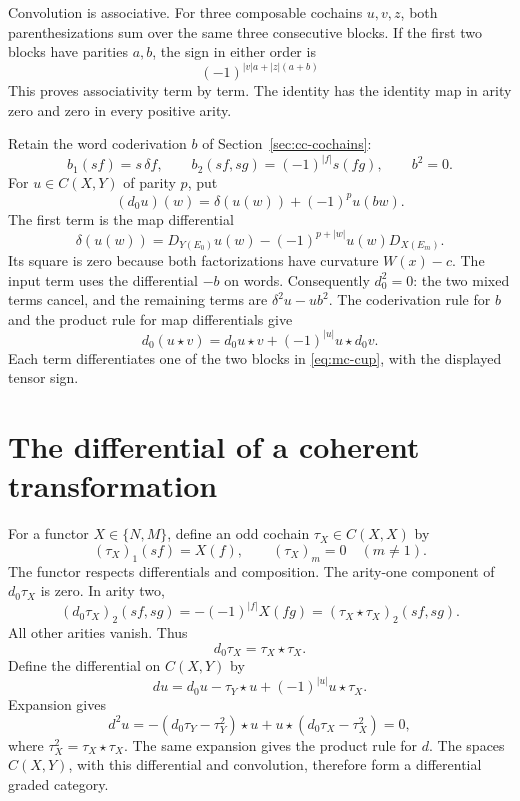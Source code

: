 Convolution is associative. For three composable cochains
\(u,v,z\), both parenthesizations sum over the same three
consecutive blocks. If the first two blocks have parities
\(a,b\), the sign in either order is
\[
 (-1)^{|v|a+|z|(a+b)}
\]
This proves associativity term by term. The identity has the
identity map in arity zero and zero in every positive arity.

Retain the word coderivation \(b\) of
Section~\ref{sec:cc-cochains}:
\[
 b_1(sf)=s\,\delta f,\qquad
 b_2(sf,sg)=(-1)^{|f|}s(fg),\qquad b^2=0.
\]
For \(u\in C(X,Y)\) of parity \(p\), put
\[
 (d_0u)(w)=\delta(u(w))+(-1)^p u(bw).
\]
The first term is the map differential
\[
 \delta(u(w))
    =D_{Y(E_0)}u(w)-(-1)^{p+|w|}u(w)D_{X(E_m)}.
\]
Its square is zero because both factorizations have curvature
\(W(x)-c\). The input term uses the differential \(-b\) on
words. Consequently \(d_0^2=0\): the two mixed terms cancel,
and the remaining terms are \(\delta^2u-u b^2\).
The coderivation rule for \(b\) and the product rule for map
differentials give
\[
 d_0(u\star v)=d_0u\star v+(-1)^{|u|}u\star d_0v.
\]
Each term differentiates one of the two blocks in
\eqref{eq:mc-cup}, with the displayed tensor sign.

\section{The differential of a coherent transformation}
\label{sec:mc-differential}

For a functor \(X\in\{N,M\}\), define an odd cochain
\(\tau_X\in C(X,X)\) by
\[
 (\tau_X)_1(sf)=X(f),\qquad(\tau_X)_m=0\quad(m\ne1).
\]
The functor respects differentials and composition.
The arity-one component of \(d_0\tau_X\) is zero.
In arity two,
\[
 (d_0\tau_X)_2(sf,sg)
   =-(-1)^{|f|}X(fg)
   =(\tau_X\star\tau_X)_2(sf,sg).
\]
All other arities vanish. Thus
\begin{equation}
 d_0\tau_X=\tau_X\star\tau_X.
 \label{eq:mc-twisting}
\end{equation}
Define the differential on \(C(X,Y)\) by
\begin{equation}
 du=d_0u-\tau_Y\star u+(-1)^{|u|}u\star\tau_X.
 \label{eq:mc-total}
\end{equation}
Expansion gives
\[
 d^2u=-(d_0\tau_Y-\tau_Y^2)\star u
                   +u\star(d_0\tau_X-\tau_X^2)=0,
\]
where \(\tau_X^2=\tau_X\star\tau_X\).
The same expansion gives the product rule for \(d\).
The spaces \(C(X,Y)\), with this differential and convolution,
therefore form a differential graded category.

